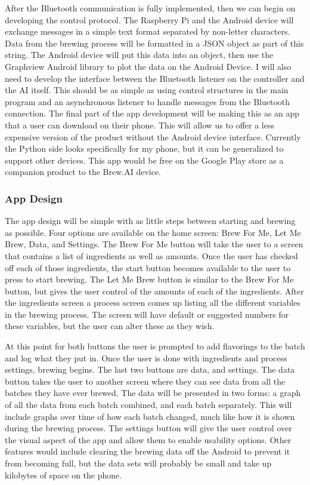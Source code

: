 \documentclass[draftclsnofoot,onecolumn,letterpaper,10pt]{IEEEtran}
\begin{document}
After the Bluetooth communication is fully implemented, then we can begin on developing the control protocol.
The Raspberry Pi and the Android device will exchange messages in a simple text format separated by non-letter characters.
Data from the brewing process will be formatted in a JSON object as part of this string.
The Android device will put this data into an object, then use the Graphview Android library to plot the data on the Android Device.
I will also need to develop the interface between the Bluetooth listener on the controller and the AI itself.
This should be as simple as using control structures in the main program and an asynchronous listener to handle messages from the Bluetooth connection.
The final part of the app development will be making this as an app that a user can download on their phone.
This will allow us to offer a less expensive version of the product without the Android device interface.
Currently the Python side looks specifically for my phone, but it can be generalized to support other devices.
This app would be free on the Google Play store as a companion product to the Brew.AI device.

\subsubsection{App Design}
The app design will be simple with as little steps between starting and brewing as possible. 
Four options are available on the home screen: Brew For Me, Let Me Brew, Data, and Settings. 
The Brew For Me button will take the user to a screen that contains a list of ingredients as well as amounts.
Once the user has checked off each of those ingredients, the start button becomes available to the user to press to start brewing.
The Let Me Brew button is similar to the Brew For Me button, but gives the user control of the amounts of each of the ingredients.
After the ingredients screen a process screen comes up listing all the different variables in the brewing process.
The screen will have default or suggested numbers for these variables, but the user can alter these as they wish.


At this point for both buttons the user is prompted to add flavorings to the batch and log what they put in.
Once the user is done with ingredients and process settings, brewing begins.
The last two buttons are data, and settings. The data button takes the user to another screen where they can see data from all the batches they have ever brewed.
The data will be presented in two forms: a graph of all the data from each batch combined, and each batch separately.
This will include graphs over time of how each batch changed, much like how it is shown during the brewing process.
The settings button will give the user control over the visual aspect of the app and allow them to enable usability options.
Other features would include clearing the brewing data off the Android to prevent it from becoming full, but the data sets will probably be small and take up kilobytes of space on the phone.
\end{document}
